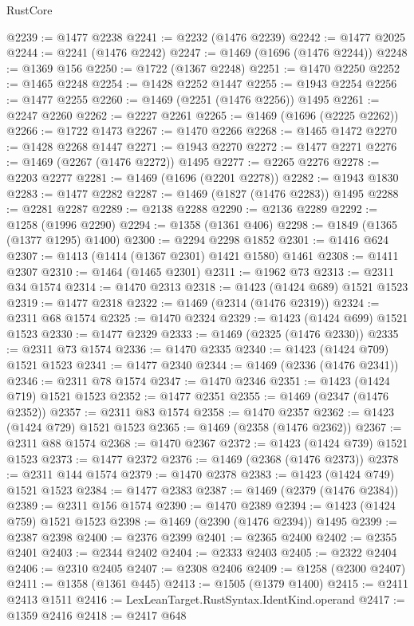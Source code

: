 \begin{lexlean}{RustCore}
\begin{coremodule}
@2239 := @1477 @2238
@2241 := @2232 (@1476 @2239)
@2242 := @1477 @2025
@2244 := @2241 (@1476 @2242)
@2247 := @1469 (@1696 (@1476 @2244))
@2248 := @1369 @156
@2250 := @1722 (@1367 @2248)
@2251 := @1470 @2250
@2252 := @1465 @2248
@2254 := @1428 @2252 @1447
@2255 := @1943 @2254
@2256 := @1477 @2255
@2260 := @1469 (@2251 (@1476 @2256)) @1495
@2261 := @2247 @2260
@2262 := @2227 @2261
@2265 := @1469 (@1696 (@2225 @2262))
@2266 := @1722 @1473
@2267 := @1470 @2266
@2268 := @1465 @1472
@2270 := @1428 @2268 @1447
@2271 := @1943 @2270
@2272 := @1477 @2271
@2276 := @1469 (@2267 (@1476 @2272)) @1495
@2277 := @2265 @2276
@2278 := @2203 @2277
@2281 := @1469 (@1696 (@2201 @2278))
@2282 := @1943 @1830
@2283 := @1477 @2282
@2287 := @1469 (@1827 (@1476 @2283)) @1495
@2288 := @2281 @2287
@2289 := @2138 @2288
@2290 := @2136 @2289
@2292 := @1258 (@1996 @2290)
@2294 := @1358 (@1361 @406)
@2298 := @1849 (@1365 (@1377 @1295) @1400)
@2300 := @2294 @2298 @1852
@2301 := @1416 @624
@2307 := @1413 (@1414 (@1367 @2301) @1421 @1580) @1461
@2308 := @1411 @2307
@2310 := @1464 (@1465 @2301)
@2311 := @1962 @73
@2313 := @2311 @34 @1574
@2314 := @1470 @2313
@2318 := @1423 (@1424 @689) @1521 @1523
@2319 := @1477 @2318
@2322 := @1469 (@2314 (@1476 @2319))
@2324 := @2311 @68 @1574
@2325 := @1470 @2324
@2329 := @1423 (@1424 @699) @1521 @1523
@2330 := @1477 @2329
@2333 := @1469 (@2325 (@1476 @2330))
@2335 := @2311 @73 @1574
@2336 := @1470 @2335
@2340 := @1423 (@1424 @709) @1521 @1523
@2341 := @1477 @2340
@2344 := @1469 (@2336 (@1476 @2341))
@2346 := @2311 @78 @1574
@2347 := @1470 @2346
@2351 := @1423 (@1424 @719) @1521 @1523
@2352 := @1477 @2351
@2355 := @1469 (@2347 (@1476 @2352))
@2357 := @2311 @83 @1574
@2358 := @1470 @2357
@2362 := @1423 (@1424 @729) @1521 @1523
@2365 := @1469 (@2358 (@1476 @2362))
@2367 := @2311 @88 @1574
@2368 := @1470 @2367
@2372 := @1423 (@1424 @739) @1521 @1523
@2373 := @1477 @2372
@2376 := @1469 (@2368 (@1476 @2373))
@2378 := @2311 @144 @1574
@2379 := @1470 @2378
@2383 := @1423 (@1424 @749) @1521 @1523
@2384 := @1477 @2383
@2387 := @1469 (@2379 (@1476 @2384))
@2389 := @2311 @156 @1574
@2390 := @1470 @2389
@2394 := @1423 (@1424 @759) @1521 @1523
@2398 := @1469 (@2390 (@1476 @2394)) @1495
@2399 := @2387 @2398
@2400 := @2376 @2399
@2401 := @2365 @2400
@2402 := @2355 @2401
@2403 := @2344 @2402
@2404 := @2333 @2403
@2405 := @2322 @2404
@2406 := @2310 @2405
@2407 := @2308 @2406
@2409 := @1258 (@2300 @2407)
@2411 := @1358 (@1361 @445)
@2413 := @1505 (@1379 @1400)
@2415 := @2411 @2413 @1511
@2416 := LexLeanTarget.RustSyntax.IdentKind.operand
@2417 := @1359 @2416
@2418 := @2417 @648

\end{coremodule}
\end{lexlean}
